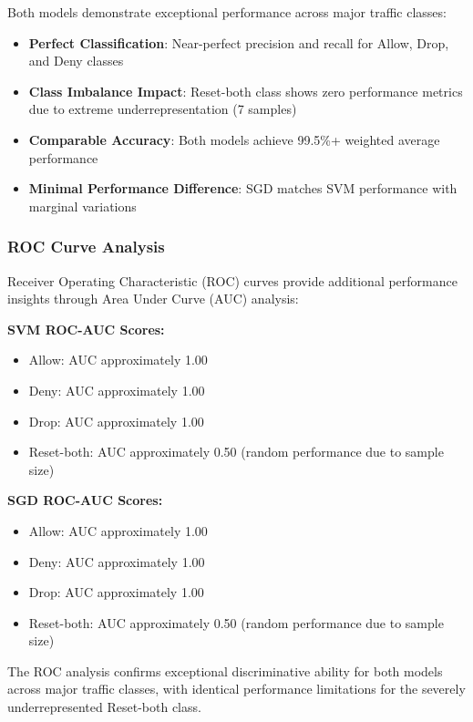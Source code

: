 \documentclass[12pt,a4paper]{article}
\begin{document}
Both models demonstrate exceptional performance across major traffic classes:

\begin{itemize}
    \item \textbf{Perfect Classification}: Near-perfect precision and recall for Allow, Drop, and Deny classes
    \item \textbf{Class Imbalance Impact}: Reset-both class shows zero performance metrics due to extreme underrepresentation (7 samples)
    \item \textbf{Comparable Accuracy}: Both models achieve 99.5\%+ weighted average performance
    \item \textbf{Minimal Performance Difference}: SGD matches SVM performance with marginal variations
\end{itemize}

\subsubsection{ROC Curve Analysis}

Receiver Operating Characteristic (ROC) curves provide additional performance insights through Area Under Curve (AUC) analysis:

\textbf{SVM ROC-AUC Scores:}
\begin{itemize}
    \item Allow: AUC approximately 1.00
    \item Deny: AUC approximately 1.00  
    \item Drop: AUC approximately 1.00
    \item Reset-both: AUC approximately 0.50 (random performance due to sample size)
\end{itemize}

\textbf{SGD ROC-AUC Scores:}
\begin{itemize}
    \item Allow: AUC approximately 1.00
    \item Deny: AUC approximately 1.00
    \item Drop: AUC approximately 1.00  
    \item Reset-both: AUC approximately 0.50 (random performance due to sample size)
\end{itemize}

The ROC analysis confirms exceptional discriminative ability for both models across major traffic classes, with identical performance limitations for the severely underrepresented Reset-both class.
\end{document}
